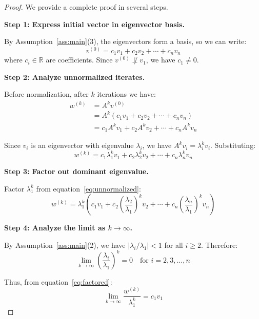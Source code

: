 \documentclass[11pt,a4paper]{article}
\begin{document}
\begin{proof}
We provide a complete proof in several steps.

\textbf{Step 1: Express initial vector in eigenvector basis.}

By Assumption~\ref{ass:main}(3), the eigenvectors form a basis, so we can write:
\begin{equation}
v^{(0)} = c_1 v_1 + c_2 v_2 + \cdots + c_n v_n
\label{eq:expansion}
\end{equation}
where $c_i \in \mathbb{R}$ are coefficients. Since $v^{(0)} \not\perp v_1$, we have $c_1 \neq 0$.

\textbf{Step 2: Analyze unnormalized iterates.}

Before normalization, after $k$ iterations we have:
\begin{align}
w^{(k)} &= A^k v^{(0)} \nonumber \\
&= A^k (c_1 v_1 + c_2 v_2 + \cdots + c_n v_n) \nonumber \\
&= c_1 A^k v_1 + c_2 A^k v_2 + \cdots + c_n A^k v_n \label{eq:linearity}
\end{align}

Since $v_i$ is an eigenvector with eigenvalue $\lambda_i$, we have $A^k v_i = \lambda_i^k v_i$. Substituting:
\begin{equation}
w^{(k)} = c_1 \lambda_1^k v_1 + c_2 \lambda_2^k v_2 + \cdots + c_n \lambda_n^k v_n
\label{eq:unnormalized}
\end{equation}

\textbf{Step 3: Factor out dominant eigenvalue.}

Factor $\lambda_1^k$ from equation~\eqref{eq:unnormalized}:
\begin{equation}
w^{(k)} = \lambda_1^k \left( c_1 v_1 + c_2 \left(\frac{\lambda_2}{\lambda_1}\right)^k v_2 + \cdots + c_n \left(\frac{\lambda_n}{\lambda_1}\right)^k v_n \right)
\label{eq:factored}
\end{equation}

\textbf{Step 4: Analyze the limit as $k \to \infty$.}

By Assumption~\ref{ass:main}(2), we have $|\lambda_i/\lambda_1| < 1$ for all $i \geq 2$. Therefore:
$$\lim_{k \to \infty} \left(\frac{\lambda_i}{\lambda_1}\right)^k = 0 \quad \text{for } i = 2, 3, \ldots, n$$

Thus, from equation~\eqref{eq:factored}:
\begin{equation}
\lim_{k \to \infty} \frac{w^{(k)}}{\lambda_1^k} = c_1 v_1
\label{eq:limit}
\end{equation}


\end{proof}
\end{document}
